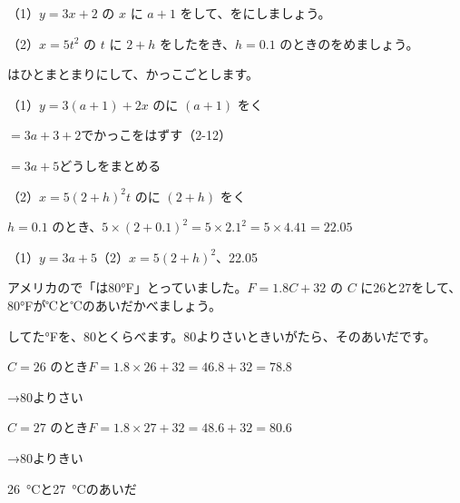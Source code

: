 \begin{reidai}
（1）$y=3x+2$ の $x$ に $a+1$ をして、をにしましょう。\par
（2）$x=5t^2$ の $t$ に $2+h$ をしたをき、$h=0.1$ のときのをめましょう。\par
\kangaekata {}はひとまとまりにして、かっこごとします。\par
\shiki（1）$y=3(a+1)+2$\quad $x$ のに $(a+1)$ をく\par
\hspace*{4.6\zw}$=3a+3+2$\quad {}でかっこをはずす（2-12）\par
\hspace*{4.6\zw}$=3a+5$\quad {}どうしをまとめる\par
\hspace*{2.6\zw}（2）$x=5(2+h)^2$\quad $t$ のに $(2+h)$ をく\par
\hspace*{4.6\zw}$h=0.1$ のとき、$5\times(2+0.1)^2=5\times2.1^2=5\times4.41=22.05$\par
\kotae（1）\nobreak $y=3a+5$\quad（2）\nobreak $x=5(2+h)^2$、22.05
\end{reidai}

\begin{reidai}
アメリカので「は80°F」とっていました。$F=1.8C+32$ の $C$ に26と27をして、80°Fが℃と℃のあいだかべましょう。\par
\kangaekata {}してた°Fを、80とくらべます。80よりさいときいがたら、そのあいだです。\par
\shiki $C=26$ のとき\quad $F=1.8\times26+32=46.8+32=78.8$\par
\hspace*{9\zw}→\enspace 80よりさい\par
\hspace*{2.6\zw}$C=27$ のとき\quad $F=1.8\times27+32=48.6+32=80.6$\par
\hspace*{9\zw}→\enspace 80よりきい\par
\kotae \qty{26}{\degreeCelsius}と\qty{27}{\degreeCelsius}のあいだ
\end{reidai}


